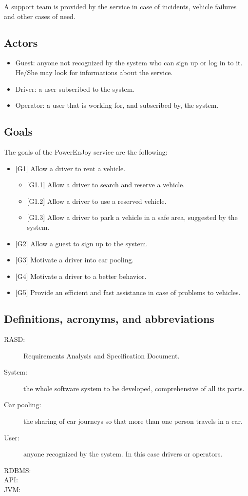 A support team is provided by the service in case of incidents, vehicle failures and other cases of need.

\subsection{Actors}
\begin{itemize}
	\item Guest: anyone not recognized by the system who can sign up or log in to it. He/She may look for informations about the service.
	\item Driver: a user subscribed to the system.
	\item Operator: a user that is working for, and subscribed by, the system.
\end{itemize}

\subsection{Goals}
The goals of the PowerEnJoy service are the following:
\begin{itemize}
	\item {[G1]} Allow a driver to rent a vehicle. 
	\begin{itemize}
		\item {[G1.1]} Allow a driver to search and reserve a vehicle. 
		\item {[G1.2]} Allow a driver to use a reserved vehicle. 
		\item {[G1.3]} Allow a driver to park a vehicle in a safe area, suggested by the system.
	\end{itemize} 
	\item {[G2]} Allow a guest to sign up to the system. 
	\item {[G3]} Motivate a driver into car pooling. 
	\item {[G4]} Motivate a driver to a better behavior. 
	\item {[G5]} Provide an efficient and fast assistance in case of problems to vehicles. 
\end{itemize}

\subsection{Definitions, acronyms, and abbreviations}

\begin{description}
	\item[RASD:] Requirements Analysis and Specification Document.
	\item[System:] the whole software system to be developed, comprehensive of all its parts.
	\item[Car pooling:] the sharing of car journeys so that more than one person travels in a car.
	\item[User:] anyone recognized by the system. In this case drivers or operators.
	\item[RDBMS:]
	\item[API:]
	\item[JVM:] 
\end{description}

